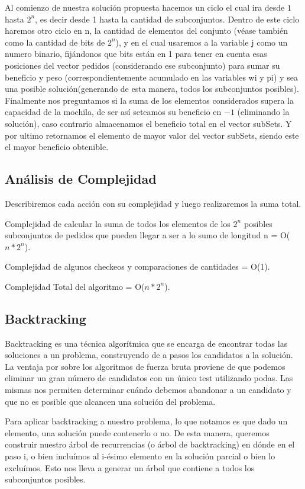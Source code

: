 Al comienzo de nuestra solución propuesta hacemos un ciclo el cual ira desde $1$ hasta $2^{n}$, es decir desde 1 hasta la cantidad de subconjuntos. Dentro de este ciclo haremos otro ciclo en n, la cantidad de elementos del conjunto (véase también como la cantidad de bits de $2^{n}$), y en el cual usaremos a la variable j como un numero binario, fijándonos que bits están en 1 para tener en cuenta esas posiciones del vector pedidos (considerando ese subconjunto) para sumar su beneficio y peso (correspondientemente acumulado en las variables wi y pi) y sea una posible solución(generando de esta manera, todos los subconjuntos posibles). Finalmente nos preguntamos si la suma de los elementos considerados supera la capacidad de la mochila, de ser así seteamos su beneficio en $-1$ (eliminando la solución), caso contrario almacenamos el beneficio total en el vector subSets. Y por ultimo retornamos el elemento de mayor valor del vector subSets, siendo este el mayor beneficio obtenible.

\subsection*{Análisis de Complejidad}
Describiremos cada acción con su complejidad y luego realizaremos la suma total.


Complejidad de calcular la suma de todos los elementos de los $2^{n}$ posibles subconjuntos de pedidos que pueden llegar a ser a lo sumo de longitud n = O($n*2^{n}$).


Complejidad de algunos checkeos y comparaciones de cantidades = O(1).


Complejidad Total del algoritmo = O($n*2^{n}$).

\subsection{Backtracking}

Backtracking es una técnica algorítmica que se encarga de encontrar todas las soluciones a un problema, construyendo de a pasos los candidatos a la solución. La ventaja por sobre los algoritmos de fuerza bruta proviene de que podemos eliminar un gran número de candidatos con un único test utilizando podas. Las mismas nos permiten determinar cuándo debemos abandonar a un candidato y que no es posible que alcancen una solución del problema.

Para aplicar backtracking a nuestro problema, lo que notamos es que dado un elemento, una solución puede contenerlo o no. De esta manera, queremos construir nuestro árbol de recurrencias (o árbol de backtracking) en dónde en el paso i, o bien incluímos al i-ésimo elemento en la solución parcial o bien lo excluímos. Esto nos lleva a generar un árbol que contiene a todos los subconjuntos posibles.

